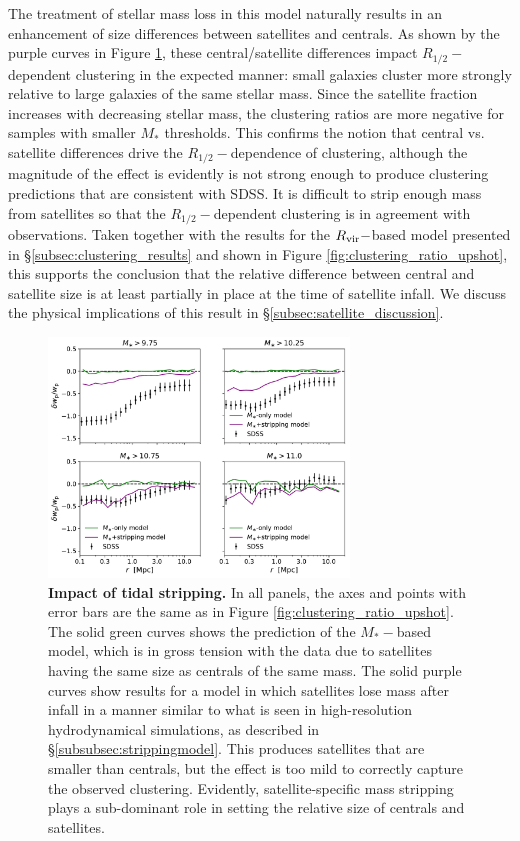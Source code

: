 \documentclass[usenatbib,usegraphicx,letterpaper]{mn2e}
\newcommand{\rhalf}{R_{1/2}}
\newcommand{\mstar}{M_{\ast}}
\newcommand{\rvir}{R_{\rm vir}}
\begin{document}
The treatment of stellar mass loss in this model naturally results in an enhancement of size differences between satellites and centrals. As shown by the purple curves in Figure \ref{fig:mstarmodelclustering}, these central/satellite differences impact $\rhalf-$dependent clustering in the expected manner: small galaxies cluster more strongly relative to large galaxies of the same stellar mass. Since the satellite fraction increases with decreasing stellar mass, the clustering ratios are more negative for samples with smaller $\mstar$ thresholds. This confirms the notion that central vs. satellite differences drive the $\rhalf-$dependence of clustering, although the magnitude of the effect is evidently is not strong enough to produce clustering predictions that are consistent with SDSS. It is difficult to strip enough mass from satellites so that the $\rhalf-$dependent clustering is in agreement with observations. Taken together with the results for the $\rvir-$based model presented in \S\ref{subsec:clustering_results} and shown in Figure \ref{fig:clustering_ratio_upshot}, this supports the conclusion that the relative difference between central and satellite size is at least partially in place at the time of satellite infall. We discuss the physical implications of this result in \S\ref{subsec:satellite_discussion}.

\begin{figure}
\centering
\includegraphics[width=8cm]{FIGS/alt_model_wp_ratios.pdf}
\caption{
{\bf Impact of tidal stripping.}
In all panels, the axes and points with error bars are the same as in Figure \ref{fig:clustering_ratio_upshot}. The solid green curves shows the prediction of the $\mstar-$based model, which is in gross tension with the data due to satellites having the same size as centrals of the same mass. The solid purple curves show results for a model in which satellites lose mass after infall in a manner similar to what is seen in high-resolution hydrodynamical simulations, as described in \S\ref{subsubsec:strippingmodel}. This produces satellites that are smaller than centrals, but the effect is too mild to correctly capture the observed clustering. Evidently, satellite-specific mass stripping plays a sub-dominant role in setting the relative size of centrals and satellites.
}
\label{fig:mstarmodelclustering}
\end{figure}
\end{document}
